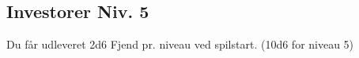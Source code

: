 \subsection*{Investorer Niv. 5}
Du får udleveret 2d6 Fjend pr. niveau ved spilstart. (10d6 for niveau 5)\\